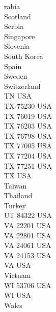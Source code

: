 \documentclass[a4paper]{article}
\begin{document}
\begin{multicols*}{3}
\begin{footnotesize}
rabia \\ Scotland \\ Serbia \\ Singapore \\ Slovenia \\ South Korea \\ Spain \\ Sweden \\ Switzerland \\ TN USA \\ TX 75230 USA \\ TX 76019 USA \\ TX 76203 USA \\ TX 76798 USA \\ TX 77005 USA \\ TX 77204 USA \\ TX 77251 USA \\ TX USA \\ Taiwan \\ Thailand \\ Turkey \\ UT 84322 USA \\ VA 22201 USA \\ VA 22801 USA \\ VA 24061 USA \\ VA 24153 USA \\ VA USA \\ Vietnam \\ WI 53706 USA \\ WI USA \\ Wales \\ 
\end{footnotesize}

\end{multicols*}

\clearpage
\end{document}
